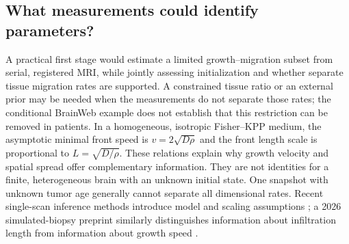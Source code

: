 \subsection{What measurements could identify parameters?}
A practical first stage would estimate a limited growth--migration subset from serial, registered MRI, while jointly assessing initialization and whether separate tissue migration rates are supported. A constrained tissue ratio or an external prior may be needed when the measurements do not separate those rates; the conditional BrainWeb example does not establish that this restriction can be removed in patients. In a homogeneous, isotropic Fisher--KPP medium, the asymptotic minimal front speed is $v=2\sqrt{D\rho}$ and the front length scale is proportional to $L=\sqrt{D/\rho}$. These relations explain why growth velocity and spatial spread offer complementary information. They are not identities for a finite, heterogeneous brain with an unknown initial state. One snapshot with unknown tumor age generally cannot separate all dimensional rates. Recent single-scan inference methods introduce model and scaling assumptions \citep{zhang2025}; a 2026 simulated-biopsy preprint similarly distinguishes information about infiltration length from information about growth speed \citep{hofmann2026}.

